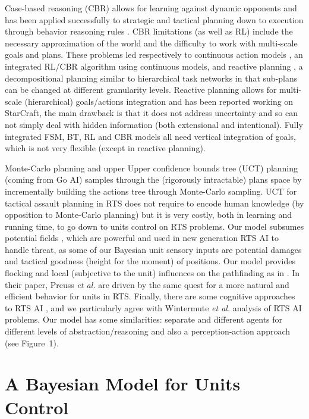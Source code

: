 Case-based reasoning (CBR) allows for learning against dynamic opponents \citep{LTW} and has been applied successfully to strategic and tactical planning down to execution through behavior reasoning rules \citep{Ontanon2007}. CBR limitations (as well as RL) include the necessary approximation of the world and the difficulty to work with multi-scale goals and plans. These problems led respectively to continuous action models \citep{Molineaux08}, an integrated RL/CBR algorithm using continuous models, and reactive planning \citep{WeberCIG10}, a decompositional planning similar to hierarchical task networks in that sub-plans can be changed at different granularity levels. Reactive planning allows for multi-scale (hierarchical) goals/actions integration and has been reported working on StarCraft, the main drawback is that it does not address uncertainty and so can not simply deal with hidden information (both extensional and intentional). 
Fully integrated FSM, BT, RL and CBR models all need vertical integration of goals, which is not very flexible (except in reactive planning).

Monte-Carlo planning \citep{Chung05} and upper Upper 
confidence bounds tree (UCT) planning (coming from Go AI) \citep{UCT} 
 samples through the (rigorously intractable) plans space by 
incrementally building the actions tree through Monte-Carlo sampling. 
UCT for tactical assault planning \citep{UCT} in RTS does not require to encode human knowledge (by opposition to Monte-Carlo planning) but it is very costly, both in learning and running time, to go down to units control on RTS problems. 
Our model subsumes potential fields \citep{Hagelback2009}, which are powerful and used in new generation RTS AI to handle threat, as some of our Bayesian unit sensory inputs are potential damages and tactical goodness (height for the moment) of positions. Our model provides flocking and local (subjective to the unit) influences on the pathfinding as in \citep{teamCompositionRTS}. In their paper, Preuss \textit{et al.} are driven by the same quest for a more natural and efficient behavior for units in RTS. Finally, there are some cognitive approaches to RTS AI \citep{SORTS}, and we particularly agree with Wintermute \textit{et al.} analysis of RTS AI problems. Our model has some similarities: separate and different agents for different levels of abstraction/reasoning and also a perception-action approach (see Figure~1).


\section{A Bayesian Model for Units Control}

